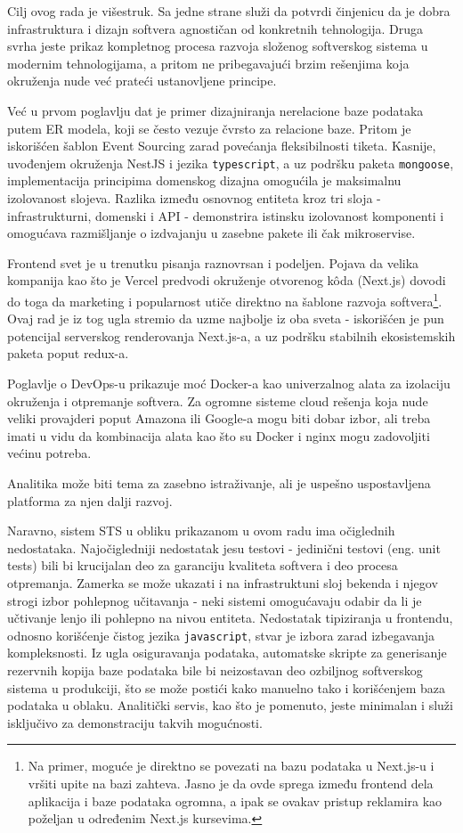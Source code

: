 \documentclass[12pt,oneside]{memoir}
\begin{document}
Cilj ovog rada je višestruk. Sa jedne strane služi da potvrdi činjenicu da je dobra infrastruktura i dizajn softvera agnostičan od konkretnih tehnologija. Druga svrha jeste prikaz kompletnog procesa razvoja složenog softverskog sistema u modernim tehnologijama, a pritom ne pribegavajući brzim rešenjima koja okruženja nude već prateći ustanovljene principe.

Već u prvom poglavlju dat je primer dizajniranja nerelacione baze podataka putem ER modela, koji se često vezuje čvrsto za relacione baze. Pritom je iskorišćen šablon Event Sourcing zarad povećanja fleksibilnosti tiketa. Kasnije, uvođenjem okruženja NestJS i jezika \verb|typescript|, a uz podršku paketa \verb|mongoose|, implementacija principima domenskog dizajna omogućila je maksimalnu izolovanost slojeva. Razlika između osnovnog entiteta kroz tri sloja - infrastrukturni, domenski i API - demonstrira istinsku izolovanost komponenti i omogućava razmišljanje o izdvajanju u zasebne pakete ili čak mikroservise.

Frontend svet je u trenutku pisanja raznovrsan i podeljen. Pojava da velika kompanija kao što je Vercel predvodi okruženje otvorenog k\^{o}da (Next.js) dovodi do toga da marketing i popularnost utiče direktno na šablone razvoja softvera\footnote{Na primer, moguće je direktno se povezati na bazu podataka u Next.js-u i vršiti upite na bazi zahteva. Jasno je da ovde sprega između frontend dela aplikacija i baze podataka ogromna, a ipak se ovakav pristup reklamira kao poželjan u određenim Next.js kursevima.}. Ovaj rad je iz tog ugla stremio da uzme najbolje iz oba sveta - iskorišćen je pun potencijal serverskog renderovanja Next.js-a, a uz podršku stabilnih ekosistemskih paketa poput redux-a.

Poglavlje o DevOps-u prikazuje moć Docker-a kao univerzalnog alata za izolaciju okruženja i otpremanje softvera. Za ogromne sisteme cloud rešenja koja nude veliki provajderi poput Amazona ili Google-a mogu biti dobar izbor, ali treba imati u vidu da kombinacija alata kao što su Docker i nginx mogu zadovoljiti većinu potreba.

Analitika može biti tema za zasebno istraživanje, ali je uspešno uspostavljena platforma za njen dalji razvoj.

Naravno, sistem STS u obliku prikazanom u ovom radu ima očiglednih nedostataka. Najočigledniji nedostatak jesu testovi - jedinični testovi (eng. unit tests) bili bi krucijalan deo za garanciju kvaliteta softvera i deo procesa otpremanja. Zamerka se može ukazati i na infrastruktuni sloj bekenda i njegov strogi izbor pohlepnog učitavanja - neki sistemi omogućavaju odabir da li je učtivanje lenjo ili pohlepno na nivou entiteta. Nedostatak tipiziranja u frontendu, odnosno korišćenje čistog jezika \verb|javascript|, stvar je izbora zarad izbegavanja kompleksnosti. Iz ugla osiguravanja podataka, automatske skripte za generisanje rezervnih kopija baze podataka bile bi neizostavan deo ozbiljnog softverskog sistema u produkciji, što se može postići kako manuelno tako i korišćenjem baza podataka u oblaku. Analitički servis, kao što je pomenuto, jeste minimalan i služi isključivo za demonstraciju takvih mogućnosti.
\end{document}
